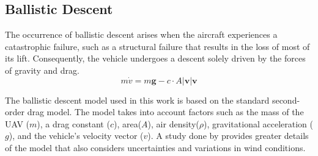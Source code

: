 \documentclass[12pt]{report}
\begin{document}
        \subsection{Ballistic Descent}
        The occurrence of ballistic descent arises when the aircraft experiences a catastrophic failure, such as a
        structural failure that results in the loss of most of its lift. Consequently, the vehicle undergoes a descent
        solely driven by the forces of gravity and drag.
        \begin{equation}
             m\dot{v} = m \mathbf{g} - c \cdot A \lvert \mathbf{v} \rvert \mathbf{v}
        \end{equation}
        
        The ballistic descent model used in this work is based on the standard second-order drag model. The model takes
        into account factors such as the mass of the UAV (\(m\)), a drag constant (\(c\)), area(\(A\)), air
        density(\(\rho\)), gravitational acceleration (\(g\)), and the vehicle's velocity vector (\(v\)). A study done by
        \cite{cour-harbo_ground_2020} provides greater details of the model that also considers uncertainties and variations in wind conditions.
\end{document}
